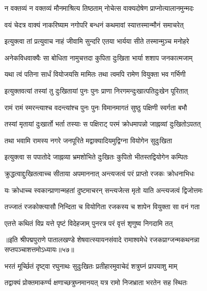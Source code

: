 \twolineshloka
{न वक्तव्यं न वक्तव्यं मौनमाश्रित्य तिष्ठताम्}
{नोचेत्स वाक्यदोषेण प्राप्नोत्यालानमुन्मदः}%

\twolineshloka
{वयं चेदत्र वाक्यं नाकरिष्याम नगोपरि}
{बन्धनं कथमावां स्यात्तस्मान्मौनं समाचरेत्}%

\twolineshloka
{इत्युक्त्वा तां प्रत्युवाच नाहं जीवामि सुन्दरि}
{एतया भार्यया सीते तस्मान्मुञ्च मनोहरे}%

\twolineshloka
{अनेकविधवाक्यैः सा बोधिता नामुचत्तदा}
{कुपिता दुःखिता भार्या शशाप जनकात्मजाम्}%

\twolineshloka
{यथा त्वं पतिना सार्धं वियोजयसि मामितः}
{तथा त्वमपि रामेण वियुक्ता भव गर्भिणी}%

\twolineshloka
{इत्युक्तवत्यां तस्यां तु दुःखितायां पुनः पुनः}
{प्राणा निरगमन्दुःखात्पतिदुःखेन पूरितात्}%

\twolineshloka
{रामं रामं स्मरन्त्याश्च वदन्त्यांश्च पुनः पुनः}
{विमानमागतं सुष्ठु पक्षिणी स्वर्गता बभौ}%

\twolineshloka
{तस्यां मृतायां दुःखार्तो भर्ता तस्याः स पक्षिराट्}
{परमं क्रोधमापन्नो जाह्नव्यां दुःखितोऽपतत्}%

\twolineshloka
{तथा भवामि रामस्य नगरे जनपूरिते}
{मद्वाक्यादियमुद्विग्ना वियोगेन सुदुःखिता}%

\twolineshloka
{इत्युक्त्वा स पपातोदे जाह्नव्या भ्रमशोभिते}
{दुःखितः कुपितो भीतस्तद्वियोगेन कम्पितः}%

\twolineshloka
{क्रुद्धत्वाद्दुःखितत्वाच्च सीताया अपमाननात्}
{अन्त्यजत्वं परं प्राप्तो रजकः क्रोधनाभिधः}%

\twolineshloka
{यः क्रोधाच्च स्वकान्प्राणान्महतां दुष्टमाचरन्}
{सन्त्यजेत्स मृतो याति अन्त्यजत्वं द्विजोत्तमः}%

\twolineshloka
{तज्जातं रजकोक्त्यासौ निन्दिता च वियोगिता}
{रजकस्य च शापेन वियुक्ता सा वनं गता}%

\twolineshloka
{एतत्ते कथितं विप्र यत्ते पृष्टं विदेहजाम्}
{पुनरत्र परं वृत्तं शृणुष्व निगदामि तत्}%


॥इति श्रीपद्मपुराणे पातालखण्डे शेषवात्स्यायनसंवादे रामाश्वमेधे रजकप्राग्जन्मकथनन्ना सप्तपञ्चाशत्तमोऽध्यायः॥५७॥



\twolineshloka
{भरतं मूर्च्छितं दृष्ट्वा रघुनाथः सुदुःखितः}
{प्रतीहारमुवाचेदं शत्रुघ्नं प्रापयाशु माम्}%

\twolineshloka
{तद्वाक्यं प्रोक्तमाकर्ण्य क्षणाच्छत्रुघ्नमानयत्}
{यत्र रामो निजभ्राता भरतेन सह स्थितः}%

